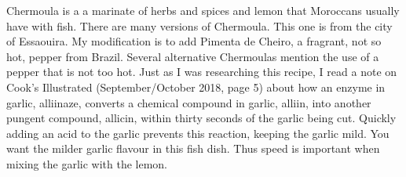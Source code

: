 \documentclass[11pt,letterpaper]{article}
\begin{document}


Chermoula is a a marinate of herbs and spices and lemon that Moroccans usually have with fish. There are many versions of Chermoula. This one is from the city of Essaouira. My modification is to add Pimenta de Cheiro, a fragrant, not so hot, pepper from Brazil. Several alternative Chermoulas mention the use of a pepper that is not too hot. Just as I was researching this recipe, I read a note on Cook's Illustrated (September/October 2018, page 5) about how an enzyme in garlic, alliinaze, converts a chemical compound in garlic, alliin, into another pungent compound, allicin, within thirty seconds of the garlic being cut. Quickly adding an acid to the garlic prevents this reaction, keeping the garlic mild. You want the milder garlic flavour in this fish dish. Thus speed is important when mixing the garlic with the lemon. 
\end{document}
